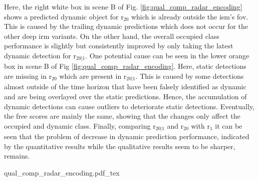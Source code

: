 Here, the right white box in scene B of Fig. \ref{fig:qual_comp_radar_encoding} shows a predicted dynamic object for \gls{r}$_{20}$ which is already outside the \gls{ism}'s \gls{fov}. This is caused by the trailing dynamic predictions which does not occur for the other deep \gls{irm} variants. On the other hand, the overall occupied class performance is slightly but consistently improved by only taking the latest dynamic detection for \gls{r}$_{20|1}$. One potential cause can be seen in the lower orange box in scene B of Fig \ref{fig:qual_comp_radar_encoding}. Here, static detections are missing in \gls{r}$_{20}$ which are present in \gls{r}$_{20|1}$. This is caused by some detections almost outside of the time horizon that have been falsely identified as dynamic and are being overlayed over the static predictions. Hence, the accumulation of dynamic detections can cause outliers to deteriorate static detections. Eventually, the free scores are mainly the same, showing that the changes only affect the occupied and dynamic class. Finally, comparing \gls{r}$_{20|1}$ and \gls{r}$_{20}$ with \gls{r}$_1$ it can be seen that the problem of decrease in dynamic prediction performance, indicated by the quantitative results while the qualitative results seem to be sharper, remains.
\begin{center}
	{qual_comp_radar_encoding.pdf_tex}
\end{center}
%
